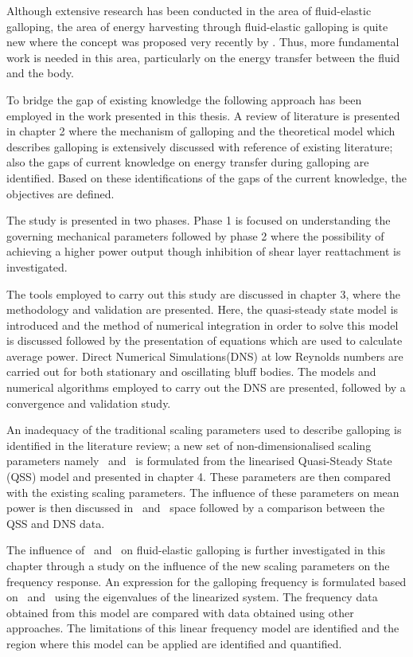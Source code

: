 Although extensive research has been conducted in the area of fluid-elastic galloping, the area of energy harvesting through fluid-elastic galloping is quite new where the concept was proposed very recently by \citet{Barrero-Gil2010a}. Thus, more fundamental work is needed in this area, particularly on the energy transfer between the fluid and the body.   
 
To bridge the gap of existing knowledge the following approach has been employed in the work presented in this thesis. A review of literature is presented in chapter 2 where the mechanism of galloping and the theoretical model which describes galloping is extensively discussed with reference of existing literature; also the  gaps of current knowledge on energy transfer during galloping are identified. Based on these identifications of the gaps of the current knowledge, the objectives are defined.

The study is presented in two phases. Phase 1 is focused on understanding the governing mechanical parameters followed by phase 2 where the possibility of achieving a higher power output though inhibition of shear layer reattachment is investigated.  

The tools employed to carry out this study are discussed in chapter 3, where the methodology and validation are presented. Here, the quasi-steady state model is introduced and the method of numerical integration in order to solve this model is discussed followed by the presentation of equations which are used to calculate average power. Direct Numerical Simulations(DNS) at low Reynolds numbers are carried out for both stationary and  oscillating bluff bodies. The models and numerical algorithms employed to carry out the DNS are presented, followed by a convergence and validation study.  

An inadequacy of the traditional scaling parameters used to describe galloping is identified in the literature review; a new set of non-dimensionalised scaling parameters namely \massstiff\ and \massdamp\ is formulated from the linearised Quasi-Steady State (QSS) model and presented in chapter 4. These parameters are then compared with the existing scaling parameters. The influence of these parameters on mean power is then discussed in \massstiff\ and \massdamp\ space followed by a comparison between the QSS and DNS data.

The influence of \massstiff\ and \massdamp\ on fluid-elastic galloping is further investigated in this chapter through a study on the influence of the new scaling parameters on the frequency response. An expression for the galloping frequency is formulated based on \massstiff\ and \massdamp\ using the eigenvalues of the linearized system. The frequency data obtained from this model are compared with data obtained using other approaches. The limitations of this linear frequency model are identified and the region where this model can be applied are identified and quantified.

